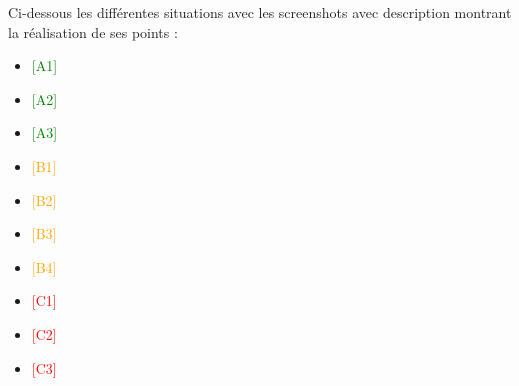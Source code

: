 Ci-dessous les différentes situations avec les screenshots avec description montrant la réalisation de ses points :

\begin{itemize}
    \item \textcolor{green}{[A1]}
    \item \textcolor{green}{[A2]}
    \item \textcolor{green}{[A3]}
    \item \textcolor{orange}{[B1]}
    \item \textcolor{orange}{[B2]}
    \item \textcolor{orange}{[B3]}
    \item \textcolor{orange}{[B4]}
    \item \textcolor{red}{[C1]}
    \item \textcolor{red}{[C2]}
    \item \textcolor{red}{[C3]}
\end{itemize}